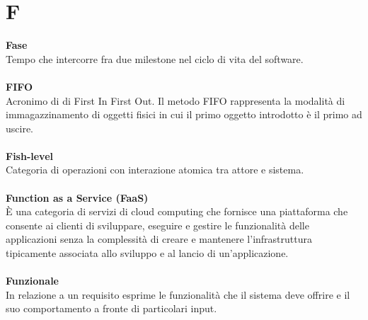 \section{F}
\textbf{Fase}\\
Tempo che intercorre fra due milestone nel ciclo di vita del software. \\ \\
\textbf{FIFO}\\
Acronimo di di First In First Out. Il metodo FIFO rappresenta la modalità di immagazzinamento di oggetti fisici in cui il primo oggetto introdotto è il primo ad uscire. \\ \\
\textbf{Fish-level}\\
Categoria di operazioni con interazione atomica tra attore e sistema. \\ \\
\textbf{Function as a Service (FaaS)}\\
È una categoria di servizi di cloud computing che fornisce una piattaforma che consente ai clienti di sviluppare, eseguire e gestire le funzionalità delle applicazioni senza la complessità di creare e mantenere l'infrastruttura tipicamente associata allo sviluppo e al lancio di un'applicazione. \\ \\
\textbf{Funzionale}\\
In relazione a un requisito esprime le funzionalità che il sistema deve offrire e il suo comportamento a fronte di particolari input.\\ 
\clearpage
